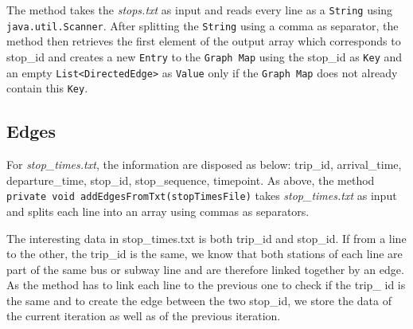 \documentclass{article}
\begin{document}
The method takes the \textit{stops.txt} as input and reads every line as a \texttt{String} using \texttt{java.util.Scanner}. After splitting the \texttt{String} using a comma as separator, the method then retrieves the first element of the output array which corresponds to stop\_id and creates a new \texttt{Entry} to the \texttt{Graph Map} using the stop\_id as \texttt{Key} and an empty \texttt{List<DirectedEdge>} as \texttt{Value} only if the \texttt{Graph Map} does not already contain this \texttt{Key}.

\subsection{Edges}

For \textit{stop\_times.txt}, the information are disposed as below: trip\_id, arrival\_time, departure\_time, stop\_id, stop\_sequence, timepoint. As above, the method \texttt{private void addEdgesFromTxt(stopTimesFile)} takes \textit{stop\_times.txt} as input and splits each line into an array using commas as separators.

The interesting data in {stop\_times.txt} is both trip\_id and stop\_id. If from a line to the other, the trip\_id is the same, we know that both stations of each line are part of the same bus or subway line and are therefore linked together by an edge.
As the method has to link each line to the previous one to check if the trip\_ id is the same and to create the edge between the two stop\_id, we store the data of the current iteration as well as of the previous iteration.

\newpage
\end{document}
